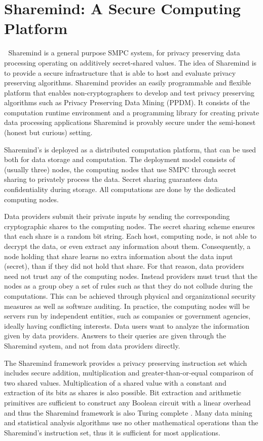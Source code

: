 \chapter{Sharemind: A Secure Computing Platform}\label{c:sharemind}

Sharemind \cite{bogdanov2008sharemind, bogdanov2013sharemind} is a general purpose SMPC system, for privacy preserving data processing operating on additively secret-shared values.
The idea of Sharemind is to provide a secure infrastructure that is able to host and evaluate privacy preserving algorithms.
Sharemind provides an easily programmable and flexible platform that enables non\hyp cryptographers to develop and test privacy preserving algorithms such as Privacy Preserving Data Mining (PPDM).
It consists of the computation runtime environment and a programming library for creating private data processing applications
Sharemind is provably secure under the semi-honest (honest but curious) setting.

Sharemind’s is deployed as a distributed computation platform, that can be used both for data storage and computation.
The deployment model consists of (usually three) nodes, the computing nodes that use SMPC through secret sharing to privately process the data.
Secret sharing guarantees data confidentiality during storage.
All computations are done by the dedicated computing nodes.

Data providers submit their private inputs by sending the corresponding cryptographic shares to the computing nodes.
The secret sharing scheme ensures that each share is a random bit string.
Each host, computing node, is not able to decrypt the data, or even extract any information about them.
Consequently, a node holding that share learns no extra information about the data input (secret), than if they did not hold that share.
For that reason, data providers need not trust any of the computing nodes.
Instead providers must trust that the nodes as a group obey a set of rules such as that they do not collude during the computations.
This can be achieved through physical and organizational security measures as well as software auditing.
In practice, the computing nodes will be servers run by independent entities, such as companies or government agencies, ideally having conflicting interests.
Data users want to analyze the information given by data providers.
Answers to their queries are given through the Sharemind system, and not from data providers directly.


The Sharemind framework provides a privacy preserving  instruction set which includes secure addition, multiplication and greater\hyp than\hyp or\hyp equal comparison of two shared values.
Multiplication of a shared value with a constant and extraction of its bits as shares is also possible.
Bit extraction and arithmetic primitives are sufficient to construct any Boolean circuit with a linear overhead and thus the Sharemind framework is also Turing complete \cite{bogdanov2008sharemind}.
Many data mining and statistical analysis algorithms use no other mathematical operations than the Sharemind's instruction set, thus it is sufficient for most applications.




